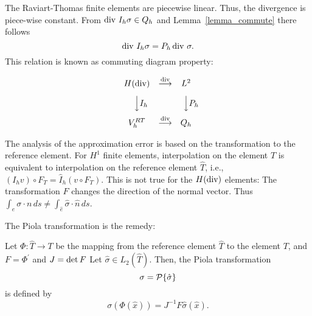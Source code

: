 The Raviart-Thomas finite elements are piecewise linear. Thus, the
divergence is piece-wise constant. From $\operatorname{div} \, I_h \sigma \in Q_h$
and Lemma~\ref{lemma_commute} there follows
$$
\operatorname{div} \, I_h \sigma = P_h \operatorname{div} \, \sigma.
$$
This relation is known as commuting diagram property:


\begin{equation}
\begin{array}{ccc}
H(\opdiv)       &      \stackrel{\opdiv}{\longrightarrow}    & 
L^2                                                                                    \\[8pt]
\Big\downarrow  \vcenter{ \rlap{$I_h$}}  &                  &
\Big\downarrow  \vcenter{ \rlap{$P_h$}}                             \\[8pt]
V_h^{RT}                   &      
\stackrel{\opdiv}{\longrightarrow}          &
 Q_h    
\end{array}
\label{diagram2}
\end{equation}


\bigskip

The analysis of the approximation error is based on the transformation
to the reference element. For $H^1$ finite elements, interpolation on
the element $T$ is equivalent to interpolation on the reference
element $\widehat T$, i.e., 
$(I_h v) \circ F_T = \hat I_h (v \circ F_T)$. This is not
true for the $H(\operatorname{div})$ elements: The transformation $F$ changes
the direction of the normal vector. Thus 
$\int_{e} \sigma \cdot n \, ds \neq \int_{\hat e} \hat \sigma \cdot \hat n \, ds$. 

The Piola transformation is the remedy:
\begin{definition}
Let $\Phi : \widehat T \rightarrow T$ be the mapping from the reference element
$\widehat T$ to the element $T$, and $F = \Phi^\prime$
and $J = \operatorname{det} F$
Let $\hat \sigma \in L_2(\widehat T)$. Then, the 
Piola transformation 
$$
\sigma = {\cal P} \{ \hat \sigma \}
$$
is defined by
$$
\sigma (\Phi (\hat x)) = J^{-1} F \hat \sigma
(\hat x).
$$
\end{definition}

